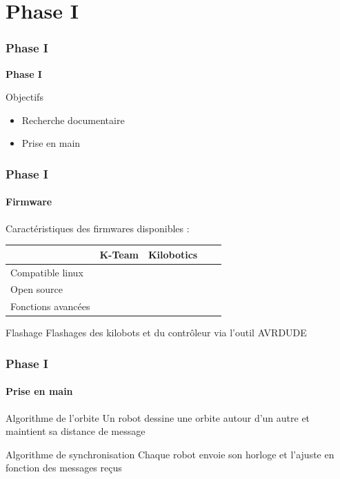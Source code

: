 \documentclass[xcolor=table]{beamer}
\begin{document}
\section{Phase I}
\begin{frame}
  \frametitle{Phase I}
  \begin{center}
    \Huge \textbf{Phase I}
  \end{center}
  \begin{block}{Objectifs}
    \begin{itemize}
      [triangle]
      \item Recherche documentaire
      \item Prise en main
    \end{itemize}
  \end{block}
\end{frame}


\begin{frame}
  \frametitle{Phase I}
  \framesubtitle{Firmware}
  Caractéristiques des firmwares disponibles :\\
  \begin{center}
    \begin{tabular}{l!{\vrule}cccc} 
      & K-Team & Kilobotics \\ \hline 
      Compatible linux   & \color{red}     & \color{green} \\ 
      Open source        & \color{red}   & \color{green}   \\ 
      Fonctions avancées & \color{red}   & \color{green}   \\
    \end{tabular}
  \end{center}
  \begin{block}{Flashage}
    Flashages des kilobots et du contrôleur via l'outil AVRDUDE
  \end{block}
\end{frame}

\begin{frame}[fragile]
  \frametitle{Phase I}
  \framesubtitle{Prise en main}
  \begin{block}{Algorithme de l'orbite}
    Un robot dessine une orbite autour d'un autre et maintient sa distance de message
  \end{block}
  \bigskip
  \begin{block}{Algorithme de synchronisation}
    Chaque robot envoie son horloge et l'ajuste en fonction des messages re\c cus
  \end{block}
\end{frame}
\end{document}
